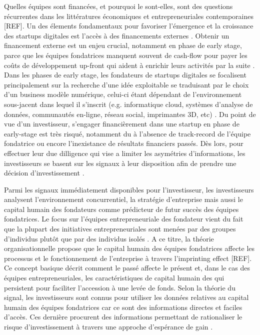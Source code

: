 \documentclass[12pt]{article}
\begin{document}
Quelles équipes sont financées, et pourquoi le sont-elles, sont des questions récurrentes dans les littératures économiques et entrepreneuriales contemporaines [REF]. Un des élements fondamentaux pour favoriser l'émergence et la croissance des startups digitales est l'accès à des financements externes \citep{klein2020start}. Obtenir un financement externe est un enjeu crucial, notamment en phase de early stage, parce que les équipes fondatrices manquent souvent de cash-flow pour payer les coûts de développement up-front qui aident à enrichir leurs activités par la suite \citep{ratzinger2018impact}. Dans les phases de early stage, les fondateurs de startups digitales se focalisent principalement sur la recherche d'une idée exploitable se traduisant par le choix d'un business modèle numérique, celui-ci étant dépendant de l'environnement sous-jacent dans lequel il s'inscrit (e.g. informatique cloud, systèmes d’analyse de données, communautés en-ligne, réseau social, imprimantes 3D, etc) \citep{nambisan2017digital}. Du point de vue d'un investisseur, s'engager financièrement dans une startup en phase de early-stage est très risqué, notamment du à l'absence de track-record de l'équipe fondatrice ou encore l'inexistance de résultats financiers passés. Dès lors, pour effectuer leur due dilligence qui vise a limiter les asymétries d'informations, les investisseurs se basent sur les signaux à leur disposition afin de prendre une décision d'investissement \citep{ko2018signaling, spence1974market}.

Parmi les signaux immédiatement disponibles pour l'investisseur, les investisseurs analysent l'environnement concurrentiel, la stratégie d'entreprise mais aussi le capital humain des fondateurs comme prédicteur de futur succès des équipes fondatrices. Le focus sur l'équipes entrepreneuriale des fondateur vient du fait que la plupart des initiatives entrepreneuriales sont menées par des groupes d'individus plutôt que par des individus isolés \citep{klotz2014new, roure1990predictors}. A ce titre, la théorie organisationnelle propose que le capital humain des équipes fondatrices affecte les processus et le fonctionnement de l'entreprise à travers l'imprinting effect [REF]. Ce concept basique décrit comment le passé affecte le présent et, dans le cas des équipes entrepreneuriales, les caractéristiques de capital humain des qui persistent pour faciliter l'accession à une levée de fonds. Selon la théorie du signal, les investisseurs sont connus pour utiliser les données relatives au capital humain des équipes fondatrices car ce sont des informations directes et faciles d'accès. Ces dernière procurent des informations permettant de rationaliser le risque d'investissement à travers une approche d'espérance de gain \citep{colombo2021use}.
\end{document}
